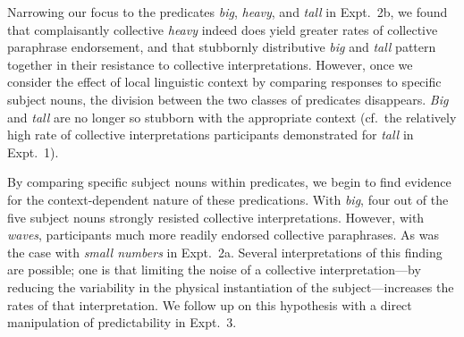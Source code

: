 \documentclass[linguex]{sp}
\begin{document}
Narrowing our focus to the predicates \emph{big}, \emph{heavy}, and \emph{tall} in Expt.~2b, we found that complaisantly collective \emph{heavy} indeed does yield greater rates of collective paraphrase endorsement, and that stubbornly distributive \emph{big} and \emph{tall} pattern together in their resistance to collective interpretations. However, once we consider the effect of local linguistic context by comparing responses to specific subject nouns, the division between the two classes of predicates disappears. \emph{Big} and \emph{tall} are no longer so stubborn with the appropriate context (cf.~the relatively high rate of collective interpretations participants demonstrated for \emph{tall} in Expt.~1).



By comparing specific subject nouns within predicates, we begin to find evidence for the context-dependent nature of these predications. With \emph{big}, four out of the five subject nouns strongly resisted collective interpretations. However, with \emph{waves}, participants much more readily endorsed collective paraphrases. As was the case with \emph{small numbers} in Expt.~2a. Several interpretations of this finding are possible; one is that limiting the noise of a collective interpretation---by reducing the variability in the physical instantiation of the subject---increases the rates of that interpretation. We follow up on this hypothesis with a direct manipulation of predictability in Expt.~3.
\end{document}
